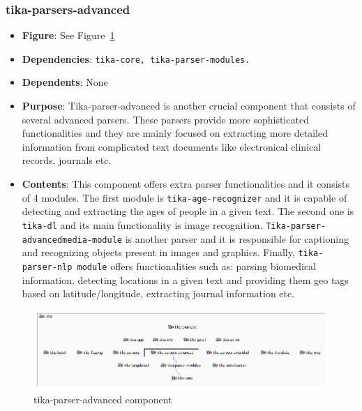 \documentclass{article}
\begin{document}
\subsubsection{tika-parsers-advanced}
\begin {itemize}
\item \textbf{Figure}: See Figure~\ref{fig:tika-parser-advanced}
\item \textbf{Dependencies}: \texttt{tika-core, tika-parser-modules.}
\item \textbf{Dependents}:  None
\item \textbf{Purpose}: Tika-parser-advanced is another crucial component that consists of several advanced parsers. These parsers provide more sophisticated functionalities and they are mainly focused on extracting more detailed information from complicated text documents like electronical clinical records, journals etc. 
\item \textbf{Contents}: This component offers extra parser functionalities and it consists of 4 modules. The first module is \texttt{tika-age-recognizer} and it is capable of detecting and extracting the ages of people in a given text. The second one is \texttt{tika-dl} and its main functionality is image recognition. \texttt{Tika-parser-advancedmedia-module} is another parser and it is responsible for captioning and recognizing objects present in images and graphics.  Finally, \texttt{tika-parser-nlp module} offers functionalities such as: parsing biomedical information, detecting locations in a given text and providing them geo tags based on latitude/longitude, extracting journal information etc.
\end{itemize}
\begin{figure}[ht]
    \centering
    \includegraphics[width=1\textwidth]{report/images/tika-parser-advanced.PNG}
    \caption{tika-parser-advanced component}
    \label{fig:tika-parser-advanced}
\end{figure}
\end{document}
